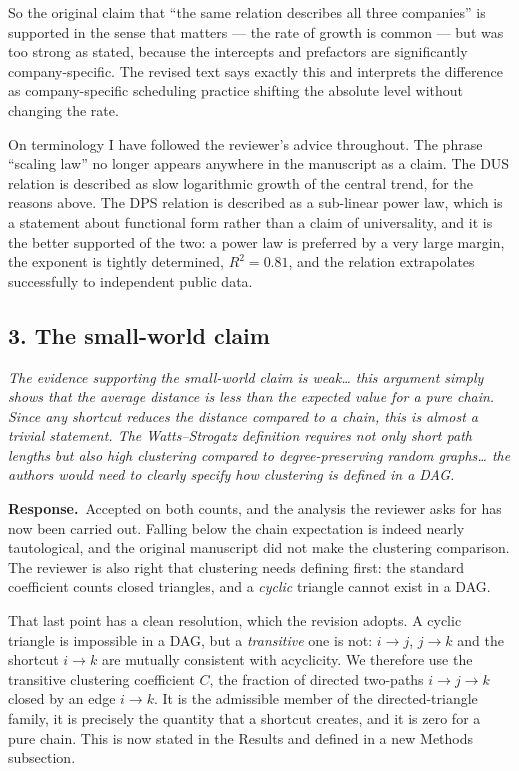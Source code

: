 \documentclass[11pt,a4paper]{article}
\newcommand{\rev}[1]{\medskip\noindent\textit{#1}\par\medskip}
\newcommand{\reply}{\noindent\textbf{Response.}\ }
\begin{document}
So the original claim that ``the same relation describes all three companies''
is supported in the sense that matters --- the rate of growth is common --- but
was too strong as stated, because the intercepts and prefactors are
significantly company-specific. The revised text says exactly this and
interprets the difference as company-specific scheduling practice shifting the
absolute level without changing the rate.

On terminology I have followed the reviewer's advice throughout. The phrase
``scaling law'' no longer appears anywhere in the manuscript as a claim. The DUS
relation is described as slow logarithmic growth of the central trend, for the
reasons above. The DPS relation is described as a sub-linear power law, which is
a statement about functional form rather than a claim of universality, and it is
the better supported of the two: a power law is preferred by a very large
margin, the exponent is tightly determined, $R^2 = 0.81$, and the relation
extrapolates successfully to independent public data.

\subsection*{3. The small-world claim}

\rev{The evidence supporting the small-world claim is weak\ldots{} this argument
simply shows that the average distance is less than the expected value for a
pure chain. Since any shortcut reduces the distance compared to a chain, this is
almost a trivial statement. The Watts--Strogatz definition requires not only
short path lengths but also high clustering compared to degree-preserving random
graphs\ldots{} the authors would need to clearly specify how clustering is defined
in a DAG.}

\reply Accepted on both counts, and the analysis the reviewer asks for has now
been carried out. Falling below the chain expectation is indeed nearly
tautological, and the original manuscript did not make the clustering
comparison. The reviewer is also right that clustering needs defining first: the
standard coefficient counts closed triangles, and a {\em cyclic} triangle cannot
exist in a DAG.

That last point has a clean resolution, which the revision adopts. A cyclic
triangle is impossible in a DAG, but a {\em transitive} one is not: $i \to j$,
$j \to k$ and the shortcut $i \to k$ are mutually consistent with acyclicity. We
therefore use the transitive clustering coefficient $C$, the fraction of
directed two-paths $i \to j \to k$ closed by an edge $i \to k$. It is the
admissible member of the directed-triangle family, it is precisely the quantity
that a shortcut creates, and it is zero for a pure chain. This is now stated in
the Results and defined in a new Methods subsection.
\end{document}
